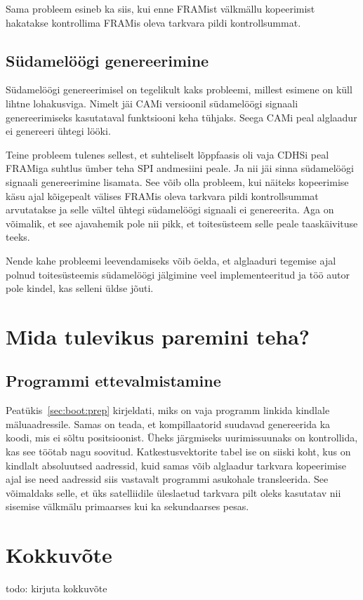 \documentclass[12pt,a4paper]{article}
\begin{document}
Sama probleem esineb ka siis, kui enne FRAMist välkmällu kopeerimist hakatakse
kontrollima FRAMis oleva tarkvara pildi kontrollsummat.

\subsection{Südamelöögi genereerimine}
Südamelöögi genereerimisel on tegelikult kaks probleemi, millest esimene on küll
lihtne lohakusviga. Nimelt jäi CAMi versioonil südamelöögi signaali
genereerimiseks kasutataval funktsiooni keha tühjaks. Seega CAMi peal alglaadur
ei genereeri ühtegi lööki.

Teine probleem tulenes sellest, et suhteliselt lõppfaasis oli vaja CDHSi peal FRAMiga
suhtlus ümber teha SPI andmesiini peale. Ja nii jäi sinna südamelöögi signaali
genereerimine lisamata. See võib olla probleem, kui näiteks kopeerimise käsu
ajal kõigepealt välises FRAMis oleva tarkvara pildi kontrollsummat arvutatakse
ja selle vältel ühtegi südamelöögi signaali ei genereerita. Aga on võimalik, et
see ajavahemik pole nii pikk, et toitesüsteem selle peale taaskäivituse teeks.

Nende kahe probleemi leevendamiseks võib öelda, et alglaaduri tegemise ajal
polnud toitesüsteemis südamelöögi jälgimine veel implementeeritud ja töö autor
pole kindel, kas selleni üldse jõuti.

\label{sec:prob:beat}
\section{Mida tulevikus paremini teha?}
\subsection{Programmi ettevalmistamine}
Peatükis~\ref{sec:boot:prep} kirjeldati, miks on vaja programm linkida kindlale
mäluaadressile. Samas on teada, et kompillaatorid suudavad genereerida ka koodi,
mis ei sõltu positsioonist. Üheks järgmiseks uurimissuunaks on kontrollida, kas
see töötab nagu soovitud. Katkestusvektorite tabel ise on siiski koht, kus on
kindlalt absoluutsed aadressid, kuid samas võib alglaadur tarkvara kopeerimise
ajal ise need aadressid siis vastavalt programmi asukohale transleerida. See
võimaldaks selle, et üks satelliidile üleslaetud tarkvara pilt oleks kasutatav
nii sisemise välkmälu primaarses kui ka sekundaarses pesas.

\section{Kokkuvõte}
todo: kirjuta kokkuvõte
\end{document}
